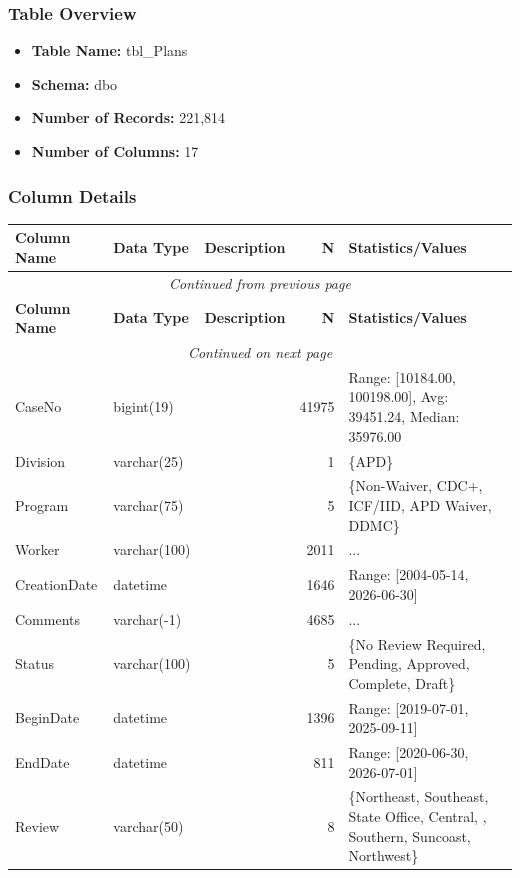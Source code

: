 \begin{landscape}
\subsubsection{Table Overview}
\begin{itemize}
\item \textbf{Table Name:} tbl\_Plans
\item \textbf{Schema:} dbo
\item \textbf{Number of Records:} 221,814
\item \textbf{Number of Columns:} 17
\end{itemize}

\subsubsection{Column Details}
\begin{longtable}{|l|l|l|r|p{6cm}|}
\hline
\textbf{Column Name} & \textbf{Data Type} & \textbf{Description} & \textbf{N} & \textbf{Statistics/Values} \\
\hline
\endfirsthead
\multicolumn{5}{c}{\textit{Continued from previous page}} \\
\hline
\textbf{Column Name} & \textbf{Data Type} & \textbf{Description} & \textbf{N} & \textbf{Statistics/Values} \\
\hline
\endhead
\hline
\multicolumn{5}{c}{\textit{Continued on next page}} \\
\endfoot
\hline
\endlastfoot
CaseNo & bigint(19) &  & 41975 & Range: [10184.00, 100198.00], Avg: 39451.24, Median: 35976.00 \\
\hline
Division & varchar(25) &  & 1 & \{APD\} \\
\hline
Program & varchar(75) &  & 5 & \{Non-Waiver, CDC+, ICF/IID, APD Waiver, DDMC\} \\
\hline
Worker & varchar(100) &  & 2011 & ... \\
\hline
CreationDate & datetime &  & 1646 & Range: [2004-05-14, 2026-06-30] \\
\hline
Comments & varchar(-1) &  & 4685 & ... \\
\hline
Status & varchar(100) &  & 5 & \{No Review Required, Pending, Approved, Complete, Draft\} \\
\hline
BeginDate & datetime &  & 1396 & Range: [2019-07-01, 2025-09-11] \\
\hline
EndDate & datetime &  & 811 & Range: [2020-06-30, 2026-07-01] \\
\hline
Review & varchar(50) &  & 8 & \{Northeast, Southeast, State Office, Central, , Southern, Suncoast, Northwest\} \\

\end{longtable}
\end{landscape}
